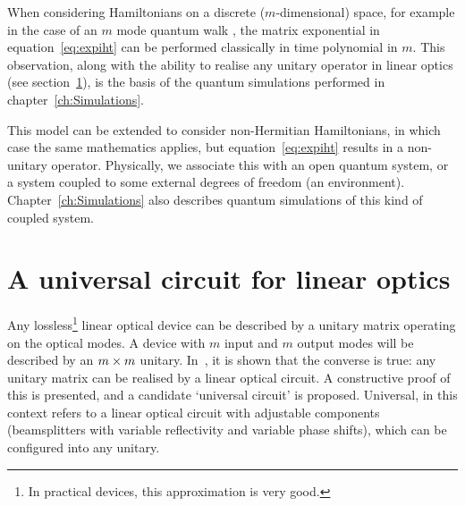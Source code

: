 When considering Hamiltonians on a discrete (\(m\)-dimensional) space, for
example in the case of an \(m\) mode quantum walk \cite{walks-peruzzo}, the
matrix exponential in equation~\ref{eq:expiht} can be performed classically in
time polynomial in \(m\). This observation, along with the ability to realise
any unitary operator in linear optics (see section~\ref{sec:ReckScheme}), is the
basis of the quantum simulations performed in chapter~\ref{ch:Simulations}.

This model can be extended to consider non-Hermitian Hamiltonians, in which
case the same mathematics applies, but equation~\ref{eq:expiht} results in a 
non-unitary operator. Physically, we associate this with an open quantum system,
or a system coupled to some external degrees of freedom (an environment).
Chapter~\ref{ch:Simulations} also describes quantum simulations of this kind of
coupled system.

\section{A universal circuit for linear optics}
\label{sec:ReckScheme}
Any lossless\footnote{In practical devices, this approximation is very good.
} linear optical device can be
described by a unitary matrix operating on the optical modes. A device with
\(m\) input and \(m\) output modes will be described by an \(m \times m\) unitary.
In~\cite{reck}, it is shown that the converse is true: any unitary matrix can
be realised by a linear optical circuit. A constructive proof of this is
presented, and a candidate `universal circuit' is proposed. Universal, in this
context refers to a linear optical circuit with adjustable components
(beamsplitters with variable reflectivity and variable phase shifts), which can
be configured into any unitary.

